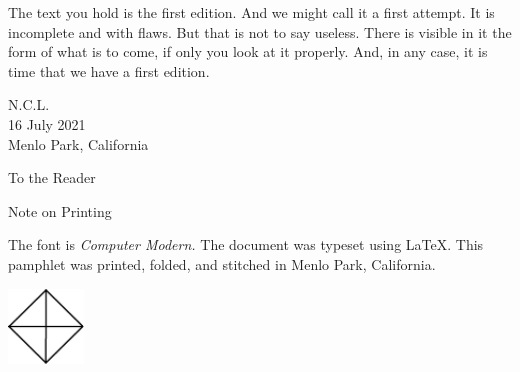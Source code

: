 The text you hold is the first edition.
And we might call it a first attempt.
It is incomplete and with flaws.
But that is not to say useless.
There is visible in it the form of what is to come, if only you look at it properly.
And, in any case, it is time that we have a first edition.

\begin{flushright}
N.C.L. \\
16 July 2021 \\
Menlo Park, California \\
\end{flushright}

\clearpage

\begin{center}
\vspace*{-1.5cm}
  \sf To the Reader
\end{center}



\clearpage

\tableofcontents
\blankpage

\clearpage




\clearpage

%
%

\blankpage

\begin{center}
\vspace*{-1.5cm}
  \sf Note on Printing
\end{center}
\noindent\noindent The font is \textit{Computer Modern.}
The document was typeset using \LaTeX.
This pamphlet was printed, folded, and stitched in Menlo Park, California.

\clearpage
\vspace*{\fill}
\begin{center}
\includegraphics[width=0.15\textwidth]{../trademark}
\end{center}
\vspace{\fill}
\thispagestyle{empty}


